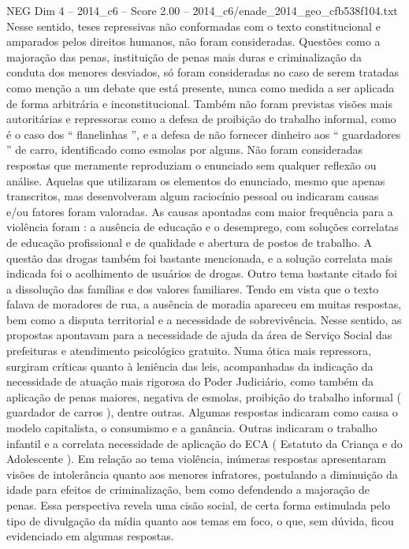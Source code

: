 \begin{textsample}{NEG Dim 4 – 2014\_c6 – Score 2.00 – 2014\_c6/enade\_2014\_geo\_cfb538f104.txt}
Nesse sentido, teses repressivas não conformadas com o texto constitucional e amparados pelos direitos humanos, não foram consideradas.
Questões como a majoração das penas, instituição de penas mais duras e criminalização da conduta dos menores desviados, só foram consideradas no caso de serem tratadas como menção a um debate que está presente, nunca como medida a ser aplicada de forma arbitrária e inconstitucional.
Também não foram previstas visões mais autoritárias e repressoras como a defesa de proibição do trabalho informal, como é o caso dos “ flanelinhas ”, e a defesa de não fornecer dinheiro aos “ guardadores ” de carro, identificado como esmolas por alguns.
Não foram consideradas respostas que meramente reproduziam o enunciado sem qualquer reflexão ou análise.
Aquelas que utilizaram os elementos do enunciado, mesmo que apenas transcritos, mas desenvolveram algum raciocínio pessoal ou indicaram causas e/ou fatores foram valoradas.
As causas apontadas com maior frequência para a violência foram : a ausência de educação e o desemprego, com soluções correlatas de educação profissional e de qualidade e abertura de postos de trabalho.
A questão das drogas também foi bastante mencionada, e a solução correlata mais indicada foi o acolhimento de usuários de drogas.
Outro tema bastante citado foi a dissolução das famílias e dos valores familiares.
Tendo em vista que o texto falava de moradores de rua, a ausência de moradia apareceu em muitas respostas, bem como a disputa territorial e a necessidade de sobrevivência.
Nesse sentido, as propostas apontavam para a necessidade de ajuda da área de Serviço Social das prefeituras e atendimento psicológico gratuito.
Numa ótica mais repressora, surgiram críticas quanto à leniência das leis, acompanhadas da indicação da necessidade de atuação mais rigorosa do Poder Judiciário, como também da aplicação de penas maiores, negativa de esmolas, proibição do trabalho informal ( guardador de carros ), dentre outras.
Algumas respostas indicaram como causa o modelo capitalista, o consumismo e a ganância.
Outras indicaram o trabalho infantil e a correlata necessidade de aplicação do ECA ( Estatuto da Criança e do Adolescente ).
Em relação ao tema violência, inúmeras respostas apresentaram visões de intolerância quanto aos menores infratores, postulando a diminuição da idade para efeitos de criminalização, bem como defendendo a majoração de penas.
Essa perspectiva revela uma cisão social, de certa forma estimulada pelo tipo de divulgação da mídia quanto aos temas em foco, o que, sem dúvida, ficou evidenciado em algumas respostas.

\end{textsample}
